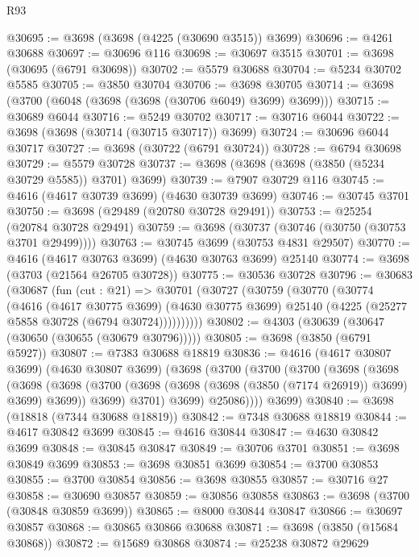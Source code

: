 \begin{lexlean}{R93}
\begin{coremodule}
@30695 := @3698 (@3698 (@4225 (@30690 @3515)) @3699)
@30696 := @4261 @30688
@30697 := @30696 @116
@30698 := @30697 @3515
@30701 := @3698 (@30695 (@6791 @30698))
@30702 := @5579 @30688
@30704 := @5234 @30702 @5585
@30705 := @3850 @30704
@30706 := @3698 @30705
@30714 := @3698 (@3700 (@6048 (@3698 (@3698 (@30706 @6049) @3699) @3699)))
@30715 := @30689 @6044
@30716 := @5249 @30702
@30717 := @30716 @6044
@30722 := @3698 (@3698 (@30714 (@30715 @30717)) @3699)
@30724 := @30696 @6044 @30717
@30727 := @3698 (@30722 (@6791 @30724))
@30728 := @6794 @30698
@30729 := @5579 @30728
@30737 := @3698 (@3698 (@3698 (@3850 (@5234 @30729 @5585)) @3701) @3699)
@30739 := @7907 @30729 @116
@30745 := @4616 (@4617 @30739 @3699) (@4630 @30739 @3699)
@30746 := @30745 @3701
@30750 := @3698 (@29489 (@20780 @30728 @29491))
@30753 := @25254 (@20784 @30728 @29491)
@30759 := @3698 (@30737 (@30746 (@30750 (@30753 @3701 @29499))))
@30763 := @30745 @3699 (@30753 @4831 @29507)
@30770 := @4616 (@4617 @30763 @3699) (@4630 @30763 @3699) @25140
@30774 := @3698 (@3703 (@21564 @26705 @30728))
@30775 := @30536 @30728
@30796 := @30683
    (@30687
      (fun (cut : @21) =>
      @30701
        (@30727
          (@30759
            (@30770
              (@30774
                (@4616
                  (@4617 @30775 @3699)
                  (@4630 @30775 @3699)
                  @25140
                  (@4225 (@25277 @5858 @30728 (@6794 @30724))))))))))
@30802 := @4303 (@30639 (@30647 (@30650 (@30655 (@30679 @30796)))))
@30805 := @3698 (@3850 (@6791 @5927))
@30807 := @7383 @30688 @18819
@30836 := @4616
    (@4617 @30807 @3699)
    (@4630 @30807 @3699)
    (@3698
      (@3700
        (@3700
          (@3700
            (@3698
              (@3698
                (@3698
                  (@3698
                    (@3700 (@3698 (@3698 (@3698 (@3850 (@7174 @26919)) @3699) @3699) @3699))
                    @3699)
                  @3701)
                @3699)
              @25086))))
      @3699)
@30840 := @3698 (@18818 (@7344 @30688 @18819))
@30842 := @7348 @30688 @18819
@30844 := @4617 @30842 @3699
@30845 := @4616 @30844
@30847 := @4630 @30842 @3699
@30848 := @30845 @30847
@30849 := @30706 @3701
@30851 := @3698 @30849 @3699
@30853 := @3698 @30851 @3699
@30854 := @3700 @30853
@30855 := @3700 @30854
@30856 := @3698 @30855
@30857 := @30716 @27
@30858 := @30690 @30857
@30859 := @30856 @30858
@30863 := @3698 (@3700 (@30848 @30859 @3699))
@30865 := @8000 @30844 @30847
@30866 := @30697 @30857
@30868 := @30865 @30866 @30688
@30871 := @3698 (@3850 (@15684 @30868))
@30872 := @15689 @30868
@30874 := @25238 @30872 @29629

\end{coremodule}
\end{lexlean}
